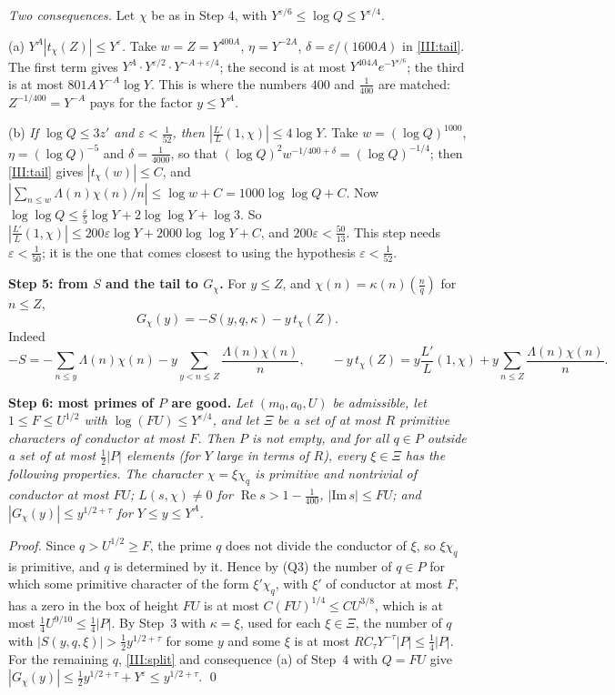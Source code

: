 \documentclass[11pt,letterpaper]{article}
\newcommand{\re}{\operatorname{Re}}
\begin{document}
\emph{Two consequences.} Let $\chi$ be as in Step 4, with $Y^{\varepsilon/6}\le\log Q\le Y^{\varepsilon/4}$.

(a) \emph{$Y^A|t_\chi(Z)|\le Y^\varepsilon$.} Take $w=Z=Y^{400A}$, $\eta=Y^{-2A}$, $\delta=\varepsilon/(1600A)$ in
\eqref{III:tail}. The first term gives $Y^A\cdot Y^{\varepsilon/2}\cdot Y^{-A+\varepsilon/4}$; the second is
at most $Y^{404A}e^{-Y^{\varepsilon/6}}$; the third is at most $801A\,Y^{-A}\log Y$. This is where the numbers $400$
and $\frac1{400}$ are matched: $Z^{-1/400}=Y^{-A}$ pays for the factor $y\le Y^A$.

(b) \emph{If $\log Q\le3z'$ and $\varepsilon<\frac1{52}$, then $|\frac{L'}L(1,\chi)|\le4\log Y$.} Take
$w=(\log Q)^{1000}$, $\eta=(\log Q)^{-5}$ and $\delta=\frac1{4000}$, so that
$(\log Q)^2w^{-1/400+\delta}=(\log Q)^{-1/4}$; then \eqref{III:tail} gives $|t_\chi(w)|\le C$, and
$|\sum_{n\le w}\Lambda(n)\chi(n)/n|\le\log w+C=1000\log\log Q+C$. Now
$\log\log Q\le\frac\varepsilon5\log Y+2\log\log Y+\log3$. So
$|\frac{L'}L(1,\chi)|\le200\varepsilon\log Y+2000\log\log Y+C$, and $200\varepsilon<\frac{50}{13}$. This step
needs $\varepsilon<\frac1{50}$; it is the one that comes closest to using the hypothesis $\varepsilon<\frac1{52}$.

\textbf{Step 5: from $S$ and the tail to $G_\chi$.} For $y\le Z$, and $\chi(n)=\kappa(n)(\frac nq)$ for $n\le Z$,
\begin{equation}\label{III:split}
 G_\chi(y)=-S(y,q,\kappa)-y\,t_\chi(Z).
\end{equation}
Indeed
\begin{equation}\label{D:129}
 -S=-\sum_{n\le y}\Lambda(n)\chi(n)-y\sum_{y<n\le Z}\frac{\Lambda(n)\chi(n)}n,\qquad
 -y\,t_\chi(Z)=y\frac{L'}L(1,\chi)+y\sum_{n\le Z}\frac{\Lambda(n)\chi(n)}n .
\end{equation}

\textbf{Step 6: most primes of $P$ are good.} \emph{Let $(m_0,a_0,U)$ be admissible, let $1\le F\le U^{1/2}$
with $\log(FU)\le Y^{\varepsilon/4}$, and let $\Xi$ be a set of at most $R$ primitive characters of conductor
at most $F$. Then $P$ is not empty, and for all $q\in P$ outside a set of at most $\frac12|P|$ elements (for
$Y$ large in terms of $R$), every $\xi\in\Xi$ has the following properties. The character $\chi=\xi\chi_q$
is primitive and nontrivial of conductor at most $FU$; $L(s,\chi)\ne0$ for $\re s>1-\frac1{400}$,
$|\mathrm{Im}\,s|\le FU$; and $|G_\chi(y)|\le y^{1/2+\tau}$ for $Y\le y\le Y^A$.}

\noindent\emph{Proof.} Since $q>U^{1/2}\ge F$, the prime $q$ does not divide the conductor of $\xi$, so
$\xi\chi_q$ is primitive, and $q$ is determined by it. Hence by (Q3) the number of $q\in P$ for which some
primitive character of the form $\xi'\chi_q$, with $\xi'$ of conductor at most $F$, has a zero in the box of
height $FU$ is at most $C(FU)^{1/4}\le CU^{3/8}$, which is at most $\frac14U^{9/10}\le\frac14|P|$. By Step~3
with $\kappa=\xi$, used for each $\xi\in\Xi$, the number of $q$ with $|S(y,q,\xi)|>\frac12y^{1/2+\tau}$ for
some $y$ and some $\xi$ is at most $RC_\tau Y^{-\tau}|P|\le\frac14|P|$. For the remaining $q$,
\eqref{III:split} and consequence (a) of Step~4 with $Q=FU$ give
$|G_\chi(y)|\le\frac12y^{1/2+\tau}+Y^\varepsilon\le y^{1/2+\tau}$. \qed
\end{document}
